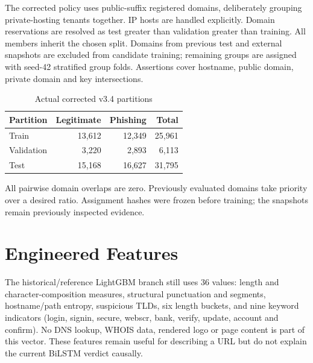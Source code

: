 The corrected policy uses public-suffix registered domains, deliberately grouping private-hosting tenants together. IP hosts are handled explicitly. Domain reservations are resolved as test greater than validation greater than training. All members inherit the chosen split. Domains from previous test and external snapshots are excluded from candidate training; remaining groups are assigned with seed-42 stratified group folds. Assertions cover hostname, public domain, private domain and key intersections.

\begin{table}[H]\centering\caption{Actual corrected v3.4 partitions}
\begin{tabular}{lrrr}\toprule Partition & Legitimate & Phishing & Total\\\midrule
Train & 13,612 & 12,349 & 25,961\\Validation & 3,220 & 2,893 & 6,113\\Test & 15,168 & 16,627 & 31,795\\\bottomrule\end{tabular}\end{table}
All pairwise domain overlaps are zero. Previously evaluated domains take priority over a desired ratio. Assignment hashes were frozen before training; the snapshots remain previously inspected evidence.

\section{Engineered Features}
The historical/reference LightGBM branch still uses 36 values: length and character-composition measures, structural punctuation and segments, hostname/path entropy, suspicious TLDs, six length buckets, and nine keyword indicators (login, signin, secure, webscr, bank, verify, update, account and confirm). No DNS lookup, WHOIS data, rendered logo or page content is part of this vector. These features remain useful for describing a URL but do not explain the current BiLSTM verdict causally.
